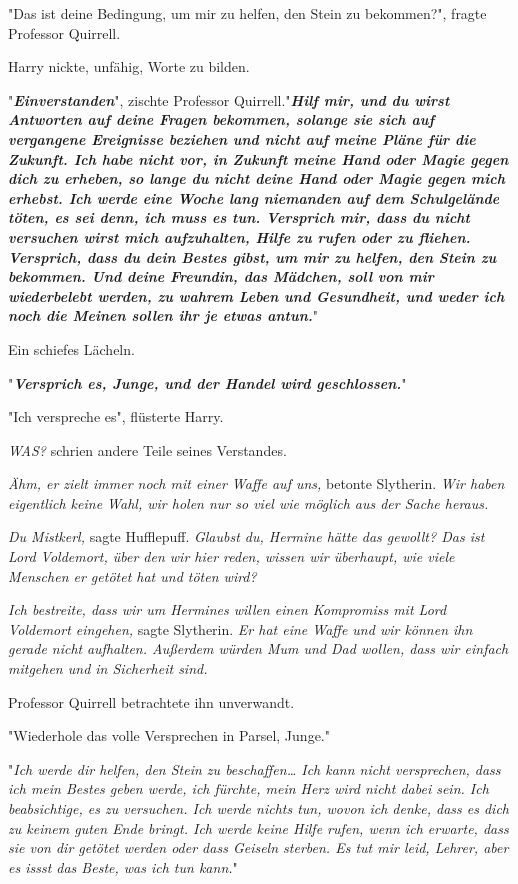 {"Das ist deine Bedingung, um mir zu helfen, den Stein zu bekommen?", fragte Professor Quirrell.

Harry nickte, unfähig, Worte zu bilden.

"\textbf{\emph{Einverstanden}}", zischte Professor Quirrell."\textbf{\emph{Hilf mir, und du wirst Antworten auf deine Fragen bekommen, solange sie sich auf vergangene Ereignisse beziehen und nicht auf meine Pläne für die Zukunft. Ich habe nicht vor, in Zukunft meine Hand oder Magie gegen dich zu erheben, so lange du nicht deine Hand oder Magie gegen mich erhebst. Ich werde eine Woche lang niemanden auf dem Schulgelände töten, es sei denn, ich muss es tun. Versprich mir, dass du nicht versuchen wirst mich aufzuhalten, Hilfe zu rufen oder zu fliehen. Versprich, dass du dein Bestes gibst, um mir zu helfen, den Stein zu bekommen. Und deine Freundin, das Mädchen, soll von mir wiederbelebt werden, zu wahrem Leben und Gesundheit, und weder ich noch die Meinen sollen ihr je etwas antun.}}"

Ein schiefes Lächeln.

"\textbf{\emph{Versprich es, Junge, und der Handel wird geschlossen.}}"

"Ich verspreche es", flüsterte Harry.

\emph{WAS?} schrien andere Teile seines Verstandes.

\emph{Ähm, er zielt immer noch mit einer Waffe auf uns,} betonte Slytherin. \emph{Wir haben eigentlich keine Wahl, wir holen nur so viel wie möglich aus der Sache heraus.}

\emph{Du Mistkerl,} sagte Hufflepuff. \emph{Glaubst du, Hermine hätte das gewollt? Das ist Lord Voldemort, über den wir hier reden, wissen wir überhaupt, wie viele Menschen er getötet hat und töten wird?}

\emph{Ich bestreite, dass wir um Hermines willen einen Kompromiss mit Lord Voldemort eingehen,} sagte Slytherin. \emph{Er hat eine Waffe und wir können ihn gerade nicht} \emph{aufhalten. Außerdem würden Mum und Dad wollen, dass wir einfach mitgehen und in Sicherheit sind.}

Professor Quirrell betrachtete ihn unverwandt.

"Wiederhole das volle Versprechen in Parsel, Junge."

"\emph{Ich werde dir helfen, den Stein zu beschaffen… Ich kann nicht versprechen, dass ich mein Bestes geben werde, ich fürchte, mein Herz wird nicht dabei sein. Ich beabsichtige, es zu versuchen. Ich werde nichts tun, wovon ich denke, dass es dich zu keinem guten Ende bringt. Ich werde keine Hilfe rufen, wenn ich erwarte, dass sie von dir getötet werden oder dass Geiseln sterben. Es tut mir leid, Lehrer, aber es issst das Beste, was ich tun kann.}"

}

